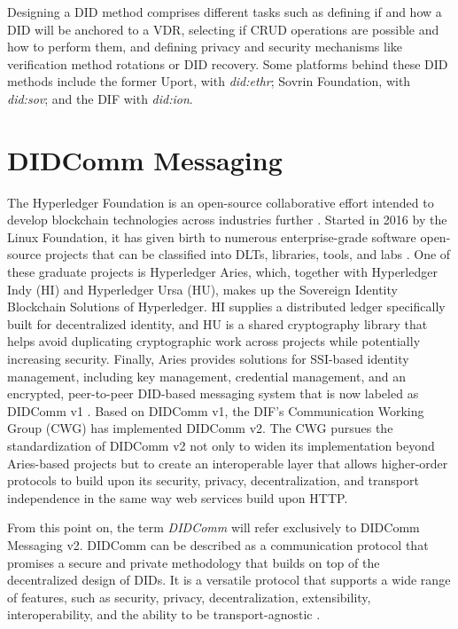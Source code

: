 Designing a DID method comprises different tasks such as defining if and how a DID will be anchored to a VDR, selecting if CRUD operations are possible and how to perform them, and defining privacy and security mechanisms like verification method rotations or DID recovery. Some platforms behind these DID methods include the former Uport, with \emph{did:ethr}; Sovrin Foundation, with \emph{did:sov}; and the DIF with \emph{did:ion}.

\section{DIDComm Messaging}\label{section:didcomm}

The Hyperledger Foundation is an open-source collaborative effort intended to develop blockchain technologies across industries further \cite{jones_boswell_2022}. Started in 2016 by the Linux Foundation, it has given birth to numerous enterprise-grade software open-source projects that can be classified into DLTs, libraries, tools, and labs \cite{lusard_lehors_muscara_boswell_zsigri_2021}. One of these graduate projects is Hyperledger Aries, which, together with Hyperledger Indy (HI) and Hyperledger Ursa (HU), makes up the Sovereign Identity Blockchain Solutions of Hyperledger. HI supplies a distributed ledger specifically built for decentralized identity, and  HU is a shared cryptography library that helps avoid duplicating cryptographic work across projects while potentially increasing security. Finally, Aries provides solutions for SSI-based identity management, including key management, credential management, and an encrypted, peer-to-peer DID-based messaging system that is now labeled as DIDComm v1 \cite{jones_boswell_2022}. 
Based on DIDComm v1, the DIF's Communication Working Group (CWG) has implemented DIDComm v2. The CWG pursues the standardization of DIDComm v2 not only to widen its implementation beyond Aries-based projects but to create an interoperable layer that allows higher-order protocols to build upon its security, privacy, decentralization, and transport independence in the same way web services build upon HTTP. \cite{young_2020} \cite{curren_looker_terbu_2020}

From this point on, the term \emph{DIDComm} will refer exclusively to DIDComm Messaging v2. DIDComm can be described as a communication protocol that promises a secure and private methodology that builds on top of the decentralized design of DIDs. It is a versatile protocol that supports a wide range of features, such as security, privacy, decentralization, extensibility, interoperability, and the ability to be transport-agnostic \cite{curren_looker_terbu_2020}.

